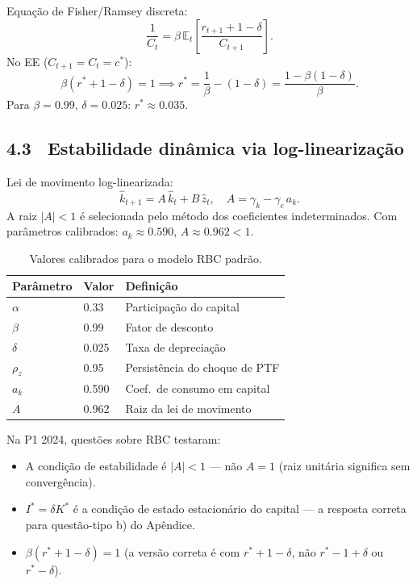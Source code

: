 \documentclass[12pt, a4paper]{article}
\newcommand{\E}{\mathbb{E}}
\newcommand{\khat}{\hat{k}}
\newcommand{\zhat}{\hat{z}}
\newcommand{\rstar}{r^*}
\newcommand{\cstar}{c^*}
\begin{document}
Equação de Fisher/Ramsey discreta:
\[
\frac{1}{C_t} = \beta\,\E_t\!\left[\frac{r_{t+1}+1-\delta}{C_{t+1}}\right].
\]
No EE ($C_{t+1}=C_t=\cstar$):
\begin{equation}
\beta(\rstar+1-\delta) = 1 \implies
\rstar = \frac{1}{\beta}-(1-\delta) = \frac{1-\beta(1-\delta)}{\beta}.
\label{eq:rstar_rbc}
\end{equation}
Para $\beta=0.99$, $\delta=0.025$: $\rstar\approx 0.035$.

\subsection*{4.3 \ Estabilidade dinâmica via log-linearização}

Lei de movimento log-linearizada:
\[
\khat_{t+1} = A\,\khat_t + B\,\zhat_t, \quad A = \gamma_k - \gamma_c\,a_k.
\]
A raiz $|A|<1$ é selecionada pelo método dos coeficientes indeterminados.
Com parâmetros calibrados: $a_k\approx 0.590$, $A\approx 0.962 < 1$.

\begin{table}[H]
\centering
\caption{Valores calibrados para o modelo RBC padrão.}
\begin{tabular}{lll}
\toprule
Parâmetro & Valor & Definição \\
\midrule
$\alpha$ & 0.33 & Participação do capital \\
$\beta$ & 0.99 & Fator de desconto \\
$\delta$ & 0.025 & Taxa de depreciação \\
$\rho_z$ & 0.95 & Persistência do choque de PTF \\
$a_k$ & 0.590 & Coef.\ de consumo em capital \\
$A$ & 0.962 & Raiz da lei de movimento \\
\bottomrule
\end{tabular}
\end{table}

\begin{provabox}[title={Atenção --- Cai na Prova (Q4 / P1 2024 Q2 adaptado)}]
Na P1 2024, questões sobre RBC testaram:
\begin{itemize}[leftmargin=1.5em, topsep=2pt, itemsep=2pt]
  \item A condição de estabilidade é $|A|<1$ --- não $A=1$ (raiz unitária significa
    sem convergência).
  \item $I^*=\delta K^*$ é a condição de estado estacionário do capital --- a resposta
    correta para questão-tipo b) do Apêndice.
  \item $\beta(r^*+1-\delta)=1$ (a versão correta é com $r^*+1-\delta$, não $r^*-1+\delta$
    ou $r^*-\delta$).
\end{itemize}
\end{provabox}
\end{document}
